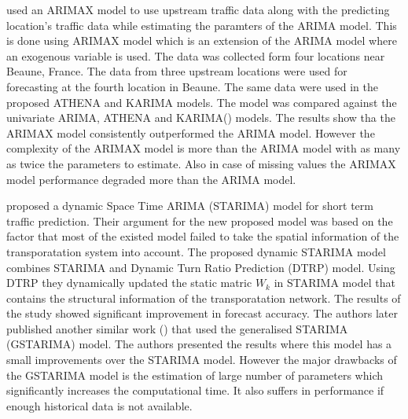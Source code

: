
\citet{williams2001multivariate} used an ARIMAX model to use upstream traffic data along with the
predicting location's traffic data while estimating the paramters of the ARIMA model. This is
done using ARIMAX model which is an extension of the ARIMA model where an exogenous variable is
used. The data was collected form four locations near Beaune, France. The data from three upstream
locations were used for forecasting at the fourth location in Beaune. The same data were used
in the proposed ATHENA and KARIMA models. The model was compared  against the univariate ARIMA,
ATHENA\citet{danech1991athena} and KARIMA(\citet{van1996combining}) models. The results show tha
the ARIMAX model consistently outperformed the ARIMA model. However the complexity of the ARIMAX
model is more than the ARIMA model with as many as twice the parameters to estimate. Also in case
of missing values the ARIMAX model performance degraded more than the ARIMA model.

\citet{min2009short} proposed a dynamic Space Time ARIMA (STARIMA) model for short term traffic
prediction. Their argument for the new proposed model was based on the factor that most of the
existed model failed to take the spatial information of the transporatation system into account.
The proposed dynamic STARIMA model combines STARIMA and Dynamic Turn Ratio Prediction (DTRP)
model. Using DTRP they dynamically updated the static matric $W_{k}$ in STARIMA model that contains
the structural information of the transporatation network. The results of the study showed
significant improvement in forecast accuracy. The authors later published another similar work
(\citet{min2010urban}) that used the generalised STARIMA (GSTARIMA) model.  The authors
presented the results where this model has a small improvements over the STARIMA model. However
the major drawbacks of the GSTARIMA model is the estimation of large number of parameters which
significantly increases the computational time. It also suffers in performance if enough historical
data is not available.

